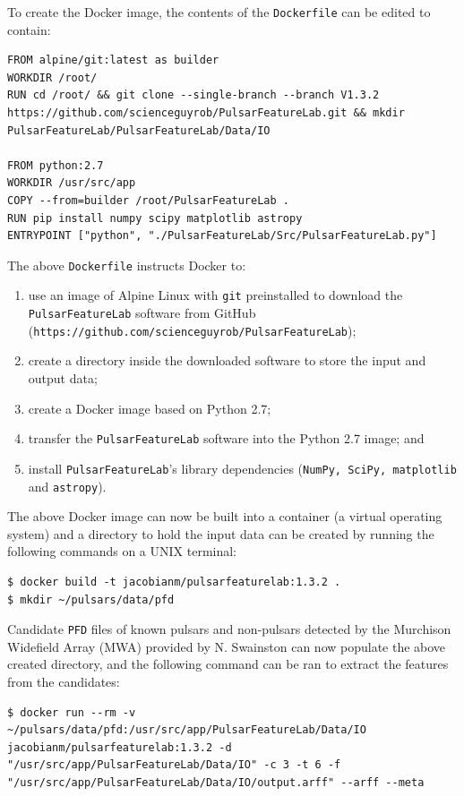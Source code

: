 \documentclass{article}
\begin{document}
To create the Docker image, the contents of the \verb|Dockerfile| can be edited to contain:

\begin{lstlisting}[title=Dockerfile]
FROM alpine/git:latest as builder
WORKDIR /root/
RUN cd /root/ && git clone --single-branch --branch V1.3.2 https://github.com/scienceguyrob/PulsarFeatureLab.git && mkdir PulsarFeatureLab/PulsarFeatureLab/Data/IO

FROM python:2.7
WORKDIR /usr/src/app
COPY --from=builder /root/PulsarFeatureLab .
RUN pip install numpy scipy matplotlib astropy
ENTRYPOINT ["python", "./PulsarFeatureLab/Src/PulsarFeatureLab.py"]
\end{lstlisting}

The above \verb|Dockerfile| instructs Docker to:
\begin{enumerate}[label=\roman*.]
    \item use an image of Alpine Linux with \verb|git| preinstalled to download the \verb|PulsarFeatureLab| software from GitHub \\(\verb|https://github.com/scienceguyrob/PulsarFeatureLab|);
    \item create a directory inside the downloaded software to store the input and output data;
    \item create a Docker image based on Python 2.7;
    \item transfer the \verb|PulsarFeatureLab| software into the Python 2.7 image; and
    \item install \verb|PulsarFeatureLab|'s library dependencies (\verb|NumPy, SciPy, matplotlib| and \verb|astropy|).
\end{enumerate}

The above Docker image can now be built into a container (a virtual operating system) and a directory to hold the input data can be created by running the following commands on a UNIX terminal:

\begin{lstlisting}[numbers=none]
$ docker build -t jacobianm/pulsarfeaturelab:1.3.2 .
$ mkdir ~/pulsars/data/pfd
\end{lstlisting}

Candidate \verb|PFD| files of known pulsars and non-pulsars detected by the Murchison Widefield Array (MWA) provided by N. Swainston can now populate the above created directory, and the following command can be ran to extract the features from the candidates:

\begin{lstlisting}[numbers=none]
$ docker run --rm -v ~/pulsars/data/pfd:/usr/src/app/PulsarFeatureLab/Data/IO jacobianm/pulsarfeaturelab:1.3.2 -d "/usr/src/app/PulsarFeatureLab/Data/IO" -c 3 -t 6 -f "/usr/src/app/PulsarFeatureLab/Data/IO/output.arff" --arff --meta
\end{lstlisting}
\end{document}
